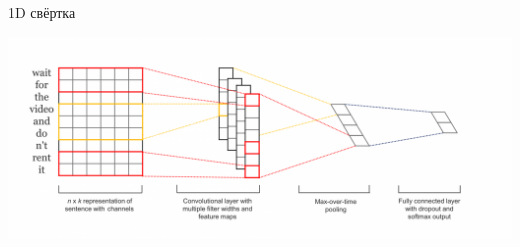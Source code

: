\documentclass[notes,12pt, aspectratio=169]{beamer}
\begin{document}
\begin{frame}{1D свёртка}
\begin{center}
	\includegraphics[width=.99\linewidth]{1d_conv.png}
\end{center}
\end{frame} 
\end{document}
